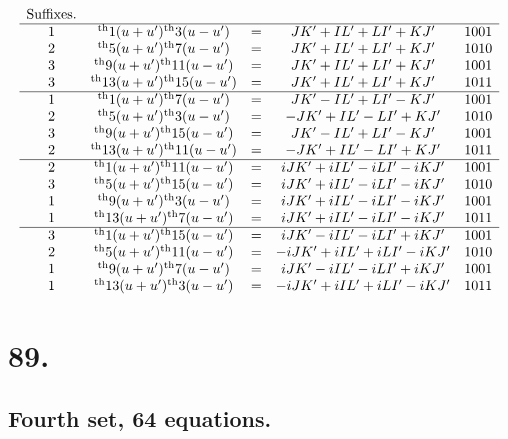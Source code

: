 \documentclass[11pt,a4paper]{book}
\providecommand{\uth}{\textsuperscript{th}}
\begin{document}
\[
\begin{array}{ccccc}
\text{Suffixes.} & & & & \\
\hline
1 & \uth{1}(u+u')\uth{3}(u-u') &=& JK' + IL' + LI' + KJ' & 1001 \\
2 & \uth{5}(u+u')\uth{7}(u-u') &=& JK' + IL' + LI' + KJ' & 1010 \\
3 & \uth{9}(u+u')\uth{11}(u-u') &=& JK' + IL' + LI' + KJ' & 1001 \\
3 & \uth{13}(u+u')\uth{15}(u-u') &=& JK' + IL' + LI' + KJ' & 1011 \\
\hline
1 & \uth{1}(u+u')\uth{7}(u-u') &=& JK' - IL' + LI' - KJ' & 1001 \\
2 & \uth{5}(u+u')\uth{3}(u-u') &=& -JK' + IL' - LI' + KJ' & 1010 \\
3 & \uth{9}(u+u')\uth{15}(u-u') &=& JK' - IL' + LI' - KJ' & 1001 \\
2 & \uth{13}(u+u')\uth{11}(u-u') &=& -JK' + IL' - LI' + KJ' & 1011 \\
\hline
2 & \uth{1}(u+u')\uth{11}(u-u') &=& iJK' + iIL' - iLI' - iKJ' & 1001 \\
3 & \uth{5}(u+u')\uth{15}(u-u') &=& iJK' + iIL' - iLI' - iKJ' & 1010 \\
1 & \uth{9}(u+u')\uth{3}(u-u') &=& iJK' + iIL' - iLI' - iKJ' & 1001 \\
1 & \uth{13}(u+u')\uth{7}(u-u') &=& iJK' + iIL' - iLI' - iKJ' & 1011 \\
\hline
3 & \uth{1}(u+u')\uth{15}(u-u') &=& iJK' - iIL' - iLI' + iKJ' & 1001 \\
2 & \uth{5}(u+u')\uth{11}(u-u') &=& -iJK' + iIL' + iLI' - iKJ' & 1010 \\
1 & \uth{9}(u+u')\uth{7}(u-u') &=& iJK' - iIL' - iLI' + iKJ' & 1001 \\
1 & \uth{13}(u+u')\uth{3}(u-u') &=& -iJK' + iIL' + iLI' - iKJ' & 1011
\end{array}
\]

\newpage
\section*{89.}
\label{sec:89}

\subsection*{Fourth set, 64 equations.}
\end{document}
